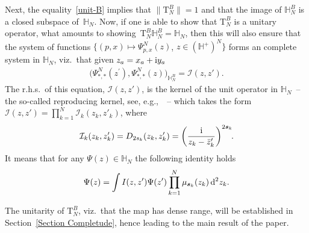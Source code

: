 Next, the equality~\eqref{unit-B} implies that $\|\mathrm T_{N}^{B}\|=1$ and that the image of $\mathbb H_{N}^{B}$ is a closed subspace of~$\mathbb H_N$. Now, if one is able to show that $\mathrm T_{N}^{B}$ is a unitary operator, what amounts to sho\-wing~$\mathrm T_{N}^{B}\mathbb H_{N}^{B}=\mathbb H_N$, then this will also ensure that the system of functions $\big\{(p,x)\mapsto \Psi^{N}_{p,{x}}(z)$, $z\in (\mathbb{H}^+)^{N}\big\}$ forms an complete system in $\mathbb H_N$, viz.~that given $z_a=x_a+{\rm i}y_a$
\begin{gather*}
\big(\Psi^N_{*,*}(z^{\prime} ), \Psi^N_{*,*}(z)\big)_{ \mathbb{H}_N^{B} } = \mathcal{I}(z,z').
\end{gather*}
The r.h.s.\ of this equation, $\mathcal I(z,z')$, is the kernel of the unit operator in $\mathbb H_N$~-- the so-called reproducing kernel,
see, e.g.,~\cite{HallBrian}~-- which takes the form $\mathcal I(z,z')=\prod_{k=1}^N \mathcal I_k(z_k,z'_k)$, where
\begin{gather*}
\mathcal I_k(z_k,z'_k)=D_{2s_k}(z_k,z'_k)=\bigg(\frac{\rm i}{z_k-\bar z'_k}\bigg)^{2\boldsymbol s_k}\!.
\end{gather*}
It means that for any $\Psi(z)\in \mathbb H_N$ the following identity holds
\begin{gather*}
\Psi(z)=\int I(z,z')\Psi(z')\prod_{k=1}^N \mu_{\boldsymbol s_k}(z_k)\,{\rm d}^2z_k.
\end{gather*}

The unitarity of $\mathrm T_{N}^{B}$, viz.~that the map has dense range, will be established in Section~\ref{Section Completude},
hence leading to the main result of the paper.

